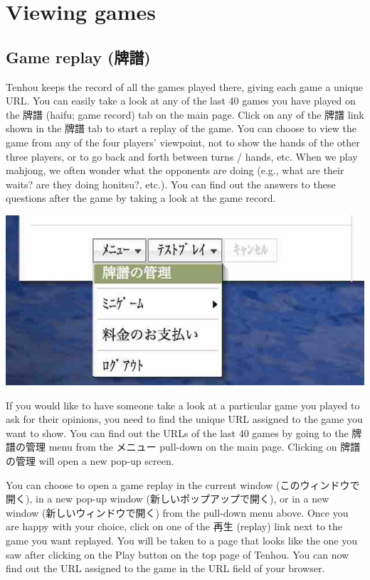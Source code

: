 \section{Viewing games}
\subsection{Game replay (牌譜)}
{\jap Tenhou} keeps the record of all the games played there, giving each game a unique URL.
You can easily take a look at any of the last 40 games you have played on the 牌譜 ({\jap haifu}; game record) tab on the main page. Click on any of the 牌譜 link shown in the 牌譜 tab to start a replay of the game. You can choose to view the game from any of the four players' viewpoint, not to show the hands of the other three players, or to go back and forth between turns / hands, etc. When we play mahjong, we often wonder what the opponents are doing (e.g., what are their waits? are they doing {\jap honitsu}?, etc.). You can find out the answers to these questions after the game by taking a look at the game record.


\begin{center}
\includegraphics[width=.4\textwidth,clip]{figs/haifukanri.jpg}
\end{center}

If you would like to have someone take a look at a particular game you played to ask for their opinions, you need to find the unique URL assigned to the game you want to show. You can find out the URLs of the last 40 games by going to the 牌譜の管理 menu from the メニュー pull-down on the main page.
Clicking on 牌譜の管理 will open a new pop-up screen.

\bigskip
You can choose to open a game replay in the current window (このウィンドウで開く), in a new pop-up window (新しいポップアップで開く), or in a new window (新しいウィンドウで開く) from the pull-down menu above. Once you are happy with your choice, click on one of the 再生 (replay) link next to the game you want replayed.
You will be taken to a page that looks like the one you saw after clicking on the Play button on the top page of {\jap Tenhou}. You can now find out the URL assigned to the game in the URL field of your browser.

